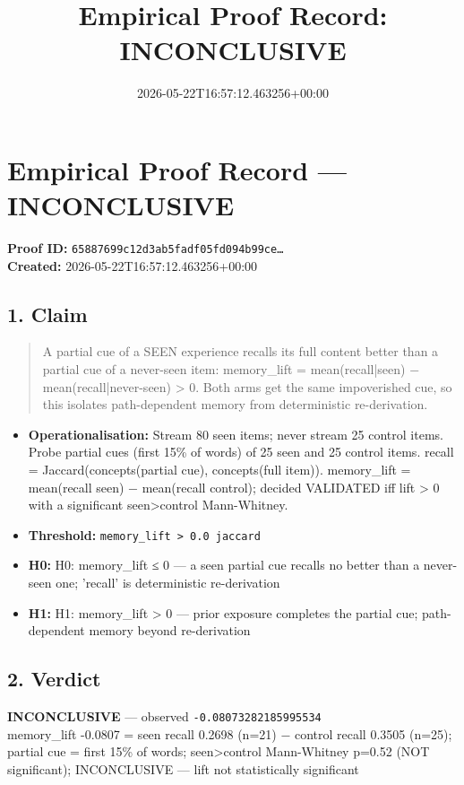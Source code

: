 \documentclass{article}
\title{Empirical Proof Record: INCONCLUSIVE}
\date{2026-05-22T16:57:12.463256+00:00}
\begin{document}
\maketitle
\section*{Empirical Proof Record --- \textcolor{inconclusive}{\textbf{INCONCLUSIVE}}}
\textbf{Proof ID:} \texttt{65887699c12d3ab5fadf05fd094b99ce\dots}\\
\textbf{Created:} 2026-05-22T16:57:12.463256+00:00
\subsection*{1. Claim}
\begin{quote}A partial cue of a SEEN experience recalls its full content better than a partial cue of a never-seen item: memory\_lift = mean(recall|seen) − mean(recall|never-seen) > 0. Both arms get the same impoverished cue, so this isolates path-dependent memory from deterministic re-derivation.\end{quote}
\begin{itemize}
\item \textbf{Operationalisation:} Stream 80 seen items; never stream 25 control items. Probe partial cues (first 15\% of words) of 25 seen and 25 control items. recall = Jaccard(concepts(partial cue), concepts(full item)). memory\_lift = mean(recall seen) − mean(recall control); decided VALIDATED iff lift > 0 with a significant seen>control Mann-Whitney.
\item \textbf{Threshold:} \texttt{memory\_lift > 0.0 jaccard}
\item \textbf{H0:} H0: memory\_lift ≤ 0 — a seen partial cue recalls no better than a never-seen one; 'recall' is deterministic re-derivation
\item \textbf{H1:} H1: memory\_lift > 0 — prior exposure completes the partial cue; path-dependent memory beyond re-derivation
\end{itemize}
\subsection*{2. Verdict}
\textcolor{inconclusive}{\textbf{INCONCLUSIVE}} --- observed \texttt{-0.08073282185995534}\\
memory\_lift -0.0807 = seen recall 0.2698 (n=21) − control recall 0.3505 (n=25); partial cue = first 15\% of words; seen>control Mann-Whitney p=0.52 (NOT significant); INCONCLUSIVE — lift not statistically significant
\end{document}
